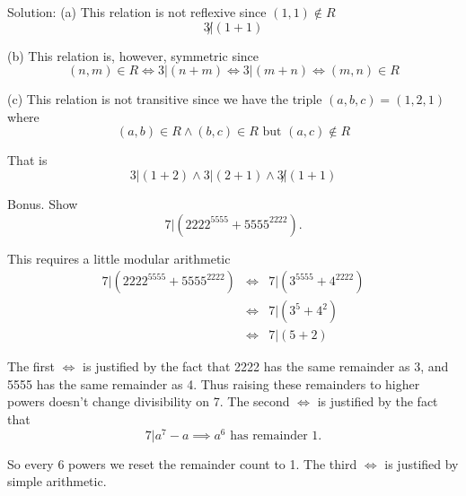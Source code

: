 \documentclass[16 pt]{amsart}
\theoremstyle{definition}
\theoremstyle{remark}
\numberwithin{equation}{subsection}
\begin{document}
\vspace{1in}

Solution: (a) This relation is not reflexive since $(1,1)\notin R$
\[
3 \not| (1+1)
\]


(b) This relation is, however, symmetric since
\[
(n,m)\in R \iff 3 | (n+m) \iff 3|(m+n) \iff (m,n)\in R
\]

(c) This relation is not transitive since we have the triple $(a,b,c)=(1,2,1)$ where
\[
(a,b)\in R \wedge (b,c)\in R \text{ but } (a,c)\notin R
\]

That is
\[
3|(1+2) \wedge 3|(2+1) \wedge 3\not|(1+1)
\]

\newpage

Bonus. Show 
\[
7 | (2222^{5555} + 5555^{2222}).
\]

This requires a little modular arithmetic
\begin{eqnarray}
7 | (2222^{5555} + 5555^{2222}) & \iff & 7|(3^{5555} + 4^{2222}) \nonumber\\
& \iff & 7|(3^5 + 4^2)\nonumber\\
& \iff & 7|(5+2) \nonumber
\end{eqnarray}

The first $\iff$ is justified by the fact that 2222 has the same remainder as 3, and 5555 has the same remainder as 4.  Thus raising these remainders to higher powers doesn't change divisibility on 7.  The second $\iff$ is justified by the fact that
\[
7| a^7 - a \implies a^6 \text{ has remainder } 1.
\]

So every 6 powers we reset the remainder count to 1.  The third $\iff$ is justified by simple arithmetic.
\end{document}
